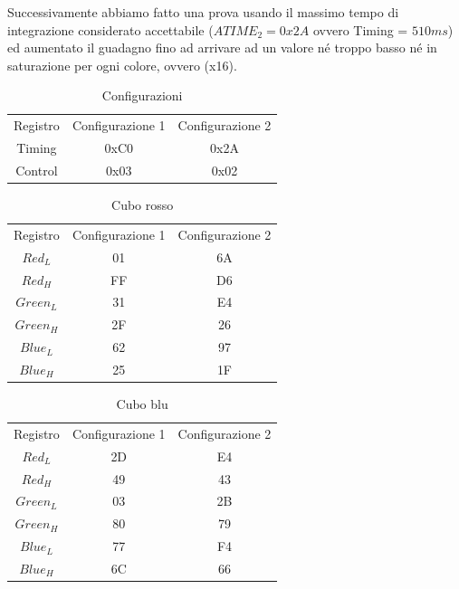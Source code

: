 \documentclass[12pt]{report}
\begin{document}
 Successivamente abbiamo fatto una prova usando il massimo tempo di integrazione considerato accettabile (\(ATIME_{2} = 0x2A\)  ovvero Timing = $510ms$) ed aumentato il guadagno fino ad arrivare ad un valore né troppo basso né in saturazione per ogni colore, ovvero (x16).
    
\label{sec:Timing}
    \begin{table}
        \centering
        \begin{tabular}{ccc}
            Registro & Configurazione 1 & Configurazione 2\\
             Timing& 0xC0 & 0x2A\\
             Control& 0x03 & 0x02\\
        \end{tabular}
        \caption{Configurazioni}
        \label{tab:configurazioni}
    \end{table}
    
    \begin{table}
        \centering
        \begin{tabular}{ccc}
            Registro & Configurazione 1 & Configurazione 2\\
             $Red_L$& 01 & 6A\\
             $Red_H$& FF & D6\\
             $Green_L$& 31 & E4\\
             $Green_H$& 2F & 26\\
             $Blue_L$& 62 & 97\\
             $Blue_H$& 25 & 1F\\
        \end{tabular}
        \caption{Cubo rosso}
        \label{tab:cubo_rosso}
    \end{table}
    
    \begin{table}
        \centering
        \begin{tabular}{ccc}
            Registro & Configurazione 1 & Configurazione 2\\
             $Red_L$& 2D & E4\\
             $Red_H$& 49 & 43\\
             $Green_L$& 03 & 2B\\
             $Green_H$& 80 & 79\\
             $Blue_L$& 77 & F4\\
             $Blue_H$& 6C & 66
        \end{tabular}
        \caption{Cubo blu}
        \label{tab:cubo_blu}
    \end{table}
        
\end{document}
